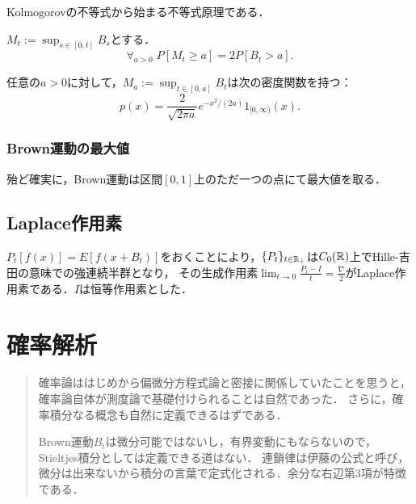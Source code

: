 \documentclass[uplatex,dvipdfmx]{jsreport}
\begin{document}
\begin{tcolorbox}[colframe=ForestGreen, colback=ForestGreen!10!white,breakable,colbacktitle=ForestGreen!40!white,coltitle=black,fonttitle=\bfseries\sffamily,
title=]
    Kolmogorovの不等式から始まる不等式原理である．
\end{tcolorbox}

\begin{theorem}
    $M_t:=\sup_{s\in[0,t]}B_s$とする．
    \[\forall_{a>0}\;P[M_t\ge a]=2P[B_t>a].\]
\end{theorem}

\begin{corollary}
    任意の$a>0$に対して，$M_a:=\sup_{t\in[0,a]}B_t$は次の密度関数を持つ：
    \[p(x)=\frac{2}{\sqrt{2\pi a}}e^{-x^2/(2a)}1_{[0,\infty)}(x).\]
\end{corollary}

\subsection{Brown運動の最大値}

\begin{lemma}
    殆ど確実に，Brown運動は区間$[0,1]$上のただ一つの点にて最大値を取る．
\end{lemma}

\section{Laplace作用素}

\begin{tcolorbox}[colframe=ForestGreen, colback=ForestGreen!10!white,breakable,colbacktitle=ForestGreen!40!white,coltitle=black,fonttitle=\bfseries\sffamily,
title=]
    $P_t[f(x)]=E[f(x+B_t)]$をおくことにより，$\{P_t\}_{t\in\mathbb{R}_+}$は$C_0(\mathbb{R})$上でHille-吉田の意味での強連続半群となり，
    その生成作用素$\lim_{t\to0}\frac{P_t-I}{t}=\frac{\nabla}{2}$がLaplace作用素である．$I$は恒等作用素とした．
\end{tcolorbox}



\chapter{確率解析}

\begin{quotation}
    確率論ははじめから偏微分方程式論と密接に関係していたことを思うと，確率論自体が測度論で基礎付けられることは自然であった．
    さらに，確率積分なる概念も自然に定義できるはずである．

    Brown運動$B_t$は微分可能ではないし，有界変動にもならないので，Stieltjes積分としては定義できる道はない．
    連鎖律は伊藤の公式と呼び，微分は出来ないから積分の言葉で定式化される．余分な右辺第3項が特徴である．
\end{quotation}
\end{document}
